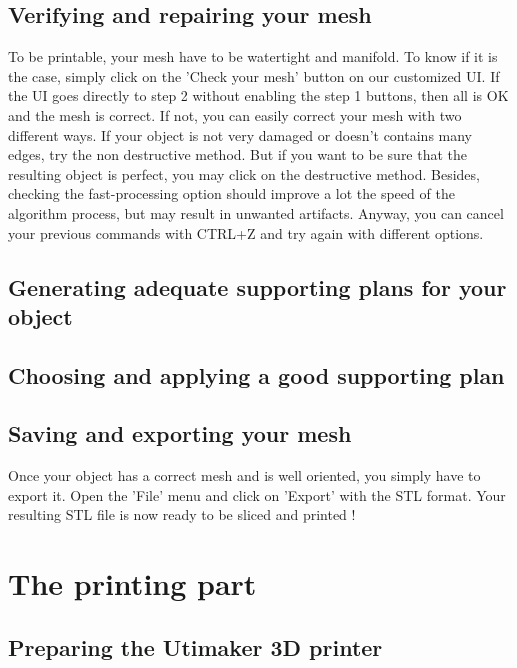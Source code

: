 \documentclass{article}
\begin{document}
\subsection{Verifying and repairing your mesh}

To be printable, your mesh have to be watertight and manifold. To know if it is the case, simply click on the 'Check your mesh' button on our customized UI. If the UI goes directly to step 2 without enabling the step 1 buttons, then all is OK and the mesh is correct. If not, you can easily correct your mesh with two different ways. If your object is not very damaged or doesn't contains many edges, try the non destructive method. But if you want to be sure that the resulting object is perfect, you may click on the destructive method. Besides, checking the fast-processing option should improve a lot the speed of the algorithm process, but may result in unwanted artifacts. Anyway, you can cancel your previous commands with CTRL+Z and try again with different options.

\subsection{Generating adequate supporting plans for your object}

\subsection{Choosing and applying a good supporting plan}

\subsection{Saving and exporting your mesh}

Once your object has a correct mesh and is well oriented, you simply have to export it. Open the 'File' menu and click on 'Export' with the STL format. Your resulting STL file is now ready to be sliced and printed !

\newpage

\section{The printing part}

\subsection{Preparing the Utimaker 3D printer}
\end{document}
